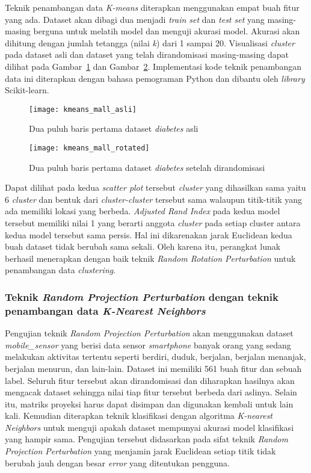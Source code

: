 Teknik penambangan data \textit{K-means} diterapkan menggunakan empat buah fitur yang ada. Dataset akan dibagi dua menjadi \textit{train set} dan \textit{test set} yang masing-masing berguna untuk melatih model dan menguji akurasi model. Akurasi akan dihitung dengan jumlah tetangga (nilai \textit{k}) dari 1 sampai 20. Visualisasi \textit{cluster} pada dataset asli dan dataset yang telah dirandomisasi masing-masing dapat dilihat pada Gambar~\ref{fig:kmeans_mall_asli} dan Gambar~\ref{fig:kmeans_mall_rotated}. Implementasi kode teknik penambangan data ini diterapkan dengan bahasa pemograman Python dan dibantu oleh \textit{library} Scikit-learn. 

\begin{figure}
	\centering
	\texttt{[image: kmeans\_mall\_asli]}
	\caption{Dua puluh baris pertama dataset \textit{diabetes} asli}
	\label{fig:kmeans_mall_asli}
\end{figure}

\begin{figure}
	\centering
	\texttt{[image: kmeans\_mall\_rotated]}
	\caption{Dua puluh baris pertama dataset \textit{diabetes} setelah dirandomisasi}
	\label{fig:kmeans_mall_rotated}
\end{figure}

Dapat dilihat pada kedua \textit{scatter plot} tersebut \textit{cluster} yang dihasilkan sama yaitu 6 \textit{cluster} dan bentuk dari \textit{cluster-cluster} tersebut sama walaupun titik-titik yang ada memiliki lokasi yang berbeda. \textit{Adjusted Rand Index} pada kedua model tersebut memiliki nilai 1 yang berarti anggota \textit{cluster} pada setiap cluster antara kedua model tersebut sama persis. Hal ini dikarenakan jarak Euclidean kedua buah dataset tidak berubah sama sekali. Oleh karena itu, perangkat lunak berhasil menerapkan dengan baik teknik \textit{Random Rotation Perturbation} untuk penambangan data \textit{clustering}.

\subsubsection{Teknik \textit{Random Projection Perturbation} dengan teknik penambangan data \textit{K-Nearest Neighbors}}
\label{sec:rpp-knn}

Pengujian teknik \textit{Random Projection Perturbation} akan menggunakan dataset \textit{mobile\_sensor} yang berisi data sensor \textit{smartphone} banyak orang yang sedang melakukan aktivitas tertentu seperti berdiri, duduk, berjalan, berjalan menanjak, berjalan menurun, dan lain-lain. Dataset ini memiliki 561 buah fitur dan sebuah label. Seluruh fitur tersebut akan dirandomisasi dan diharapkan hasilnya akan mengacak dataset sehingga nilai tiap fitur tersebut berbeda dari aslinya. Selain itu, matriks proyeksi harus dapat disimpan dan digunakan kembali untuk lain kali. Kemudian diterapkan teknik klasifikasi dengan algoritma \textit{K-nearest Neighbors} untuk menguji apakah dataset mempunyai akurasi model klasifikasi yang hampir sama. Pengujian tersebut didasarkan pada sifat teknik \textit{Random Projection Perturbation} yang menjamin jarak Euclidean setiap titik tidak berubah jauh dengan besar \textit{error} yang ditentukan pengguna.

